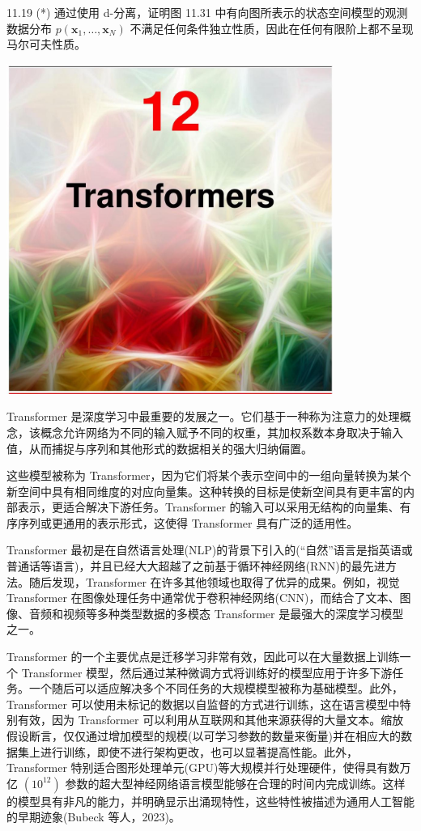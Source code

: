 \documentclass[10pt]{article}
\begin{document}
11.19 (*) 通过使用 d-分离，证明图 11.31 中有向图所表示的状态空间模型的观测数据分布 \(p\left( {{\mathbf{x}}_{1},\ldots ,{\mathbf{x}}_{N}}\right)\) 不满足任何条件独立性质，因此在任何有限阶上都不呈现马尔可夫性质。

\begin{center}
\includegraphics[max width=0.8\textwidth]{images/0194e279-9b28-703a-88f4-c3ac21e2010d_376_474_349_1074_1086_0.jpg}
\end{center}
\hspace*{3em} 

Transformer 是深度学习中最重要的发展之一。它们基于一种称为注意力的处理概念，该概念允许网络为不同的输入赋予不同的权重，其加权系数本身取决于输入值，从而捕捉与序列和其他形式的数据相关的强大归纳偏置。

这些模型被称为 Transformer，因为它们将某个表示空间中的一组向量转换为某个新空间中具有相同维度的对应向量集。这种转换的目标是使新空间具有更丰富的内部表示，更适合解决下游任务。Transformer 的输入可以采用无结构的向量集、有序序列或更通用的表示形式，这使得 Transformer 具有广泛的适用性。

Transformer 最初是在自然语言处理(NLP)的背景下引入的(“自然”语言是指英语或普通话等语言)，并且已经大大超越了之前基于循环神经网络(RNN)的最先进方法。随后发现，Transformer 在许多其他领域也取得了优异的成果。例如，视觉 Transformer 在图像处理任务中通常优于卷积神经网络(CNN)，而结合了文本、图像、音频和视频等多种类型数据的多模态 Transformer 是最强大的深度学习模型之一。

Transformer 的一个主要优点是迁移学习非常有效，因此可以在大量数据上训练一个 Transformer 模型，然后通过某种微调方式将训练好的模型应用于许多下游任务。一个随后可以适应解决多个不同任务的大规模模型被称为基础模型。此外，Transformer 可以使用未标记的数据以自监督的方式进行训练，这在语言模型中特别有效，因为 Transformer 可以利用从互联网和其他来源获得的大量文本。缩放假设断言，仅仅通过增加模型的规模(以可学习参数的数量来衡量)并在相应大的数据集上进行训练，即使不进行架构更改，也可以显著提高性能。此外，Transformer 特别适合图形处理单元(GPU)等大规模并行处理硬件，使得具有数万亿 \(\left( {10}^{12}\right)\) 参数的超大型神经网络语言模型能够在合理的时间内完成训练。这样的模型具有非凡的能力，并明确显示出涌现特性，这些特性被描述为通用人工智能的早期迹象(Bubeck 等人，2023)。
\end{document}
